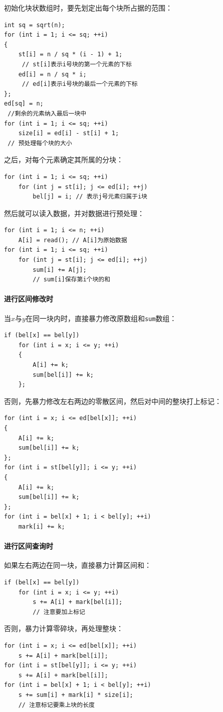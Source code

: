 \documentclass{cjc}
\begin{document}
初始化块状数组时，要先划定出每个块所占据的范围：
\begin{lstlisting}
int sq = sqrt(n);
for (int i = 1; i <= sq; ++i)
{
    st[i] = n / sq * (i - 1) + 1;
     // st[i]表示i号块的第一个元素的下标
    ed[i] = n / sq * i;
     // ed[i]表示i号块的最后一个元素的下标
};
ed[sq] = n;
 //剩余的元素纳入最后一块中
for (int i = 1; i <= sq; ++i)
    size[i] = ed[i] - st[i] + 1;
 // 预处理每个块的大小
\end{lstlisting}
之后，对每个元素确定其所属的分块：
\begin{lstlisting}
for (int i = 1; i <= sq; ++i)
    for (int j = st[i]; j <= ed[i]; ++j)
        bel[j] = i; // 表示j号元素归属于i块
\end{lstlisting}
然后就可以读入数据，并对数据进行预处理：
\begin{lstlisting}
for (int i = 1; i <= n; ++i)
    A[i] = read(); // A[i]为原始数据
for (int i = 1; i <= sq; ++i)
    for (int j = st[i]; j <= ed[i]; ++j)
        sum[i] += A[j];
        // sum[i]保存第i个块的和
\end{lstlisting}
 
\paragraph{进行区间修改时} 当$x$与$y$在同一块内时，直接暴力修改原数组和\lstinline{sum}数组：
\begin{lstlisting}
if (bel[x] == bel[y])
    for (int i = x; i <= y; ++i)
    {
        A[i] += k;
        sum[bel[i]] += k;
    };
\end{lstlisting}
否则，先暴力修改左右两边的零散区间，然后对中间的整块打上标记：
\begin{lstlisting}
for (int i = x; i <= ed[bel[x]]; ++i)
{
    A[i] += k;
    sum[bel[i]] += k;
};
for (int i = st[bel[y]]; i <= y; ++i)
{
    A[i] += k;
    sum[bel[i]] += k;
};
for (int i = bel[x] + 1; i < bel[y]; ++i)
    mark[i] += k;
\end{lstlisting}

\paragraph{进行区间查询时} 如果左右两边在同一块，直接暴力计算区间和：
\begin{lstlisting}
if (bel[x] == bel[y])
    for (int i = x; i <= y; ++i)
        s += A[i] + mark[bel[i]]; 
        // 注意要加上标记
\end{lstlisting}
否则，暴力计算零碎块，再处理整块：
\begin{lstlisting}
for (int i = x; i <= ed[bel[x]]; ++i)
    s += A[i] + mark[bel[i]];
for (int i = st[bel[y]]; i <= y; ++i)
    s += A[i] + mark[bel[i]];
for (int i = bel[x] + 1; i < bel[y]; ++i)
    s += sum[i] + mark[i] * size[i]; 
    // 注意标记要乘上块的长度
\end{lstlisting}
\end{document}
